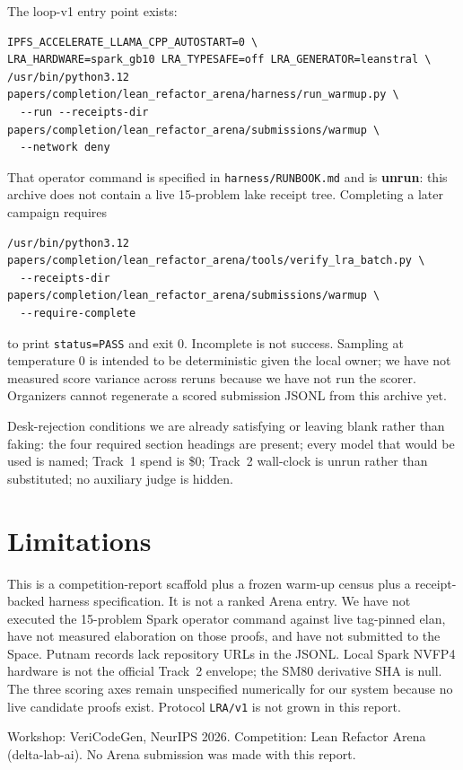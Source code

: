 \documentclass{article}
\begin{document}
The loop-v1 entry point exists:
\begin{verbatim}
IPFS_ACCELERATE_LLAMA_CPP_AUTOSTART=0 \
LRA_HARDWARE=spark_gb10 LRA_TYPESAFE=off LRA_GENERATOR=leanstral \
/usr/bin/python3.12 papers/completion/lean_refactor_arena/harness/run_warmup.py \
  --run --receipts-dir papers/completion/lean_refactor_arena/submissions/warmup \
  --network deny
\end{verbatim}
That operator command is specified in \texttt{harness/RUNBOOK.md} and is \textbf{unrun}: this archive does not contain a live 15-problem lake receipt tree. Completing a later campaign requires
\begin{verbatim}
/usr/bin/python3.12 papers/completion/lean_refactor_arena/tools/verify_lra_batch.py \
  --receipts-dir papers/completion/lean_refactor_arena/submissions/warmup \
  --require-complete
\end{verbatim}
to print \texttt{status=PASS} and exit 0. Incomplete is not success. Sampling at temperature 0 is intended to be deterministic given the local owner; we have not measured score variance across reruns because we have not run the scorer. Organizers cannot regenerate a scored submission JSONL from this archive yet.

Desk-rejection conditions we are already satisfying or leaving blank rather than faking: the four required section headings are present; every model that would be used is named; Track~1 spend is \$0; Track~2 wall-clock is unrun rather than substituted; no auxiliary judge is hidden.

\section{Limitations}

This is a competition-report scaffold plus a frozen warm-up census plus a receipt-backed harness specification. It is not a ranked Arena entry. We have not executed the 15-problem Spark operator command against live tag-pinned elan, have not measured elaboration on those proofs, and have not submitted to the Space. Putnam records lack repository URLs in the JSONL. Local Spark NVFP4 hardware is not the official Track~2 envelope; the SM80 derivative SHA is null. The three scoring axes remain unspecified numerically for our system because no live candidate proofs exist. Protocol \texttt{LRA/v1} is not grown in this report.

\begin{ack}
Workshop: VeriCodeGen, NeurIPS 2026. Competition: Lean Refactor Arena (delta-lab-ai). No Arena submission was made with this report.
\end{ack}
\end{document}
